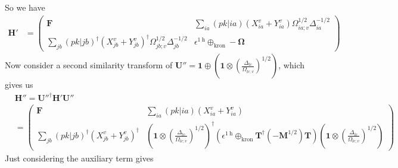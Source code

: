 So we have
\begin{align}
    \bm{H'} &= \begin{pmatrix} \bm{F} & \sum_{ia} (pk|ia) \left( X_{ia}^{v} + Y_{ia}^{v} \right) \Omega_{ia;v}^{1/2} \Delta _{ia}^{-1/2} \\ \sum_{jb} (pk|jb)^\dagger \left( X_{jb}^{v} + Y_{jb}^{v} \right)^\dagger \Omega_{jb;v}^{1/2} \Delta _{jb}^{-1/2} & \epsilon^{1 \mathrm{~h}} \oplus_{\text{kron}} - \bm{\Omega }\end{pmatrix}
\end{align}
Now consider a second similarity transform of $\bm{U}'' = \bm{1} \oplus \left( \bm{1} \otimes \left(\frac{\Delta _{lc}}{\Omega _{lc;v}}\right)^{1/2} \right)$, which gives us
\begin{align}
    &\bm{H''} = \bm{U}''^\dag \bm{H'} \bm{U}'' \\
&= \begin{pmatrix} \bm{F} & \sum_{ia} (pk|ia) \left( X_{ia}^{v} + Y_{ia}^{v} \right) \\ \sum_{jb} (pk|jb)^\dagger \left( X_{jb}^{v} + Y_{jb}^{v} \right)^\dagger & \left( \bm{1} \otimes \left(\frac{\Delta _{lc}}{\Omega _{lc;v}}\right)^{1/2} \right)^\dag \left(\epsilon^{1 \mathrm{~h}} \oplus_{\text{kron}}\bm{T}^\dagger (-\bm{M}^{1/2}) \bm{T}\right)\left( \bm{1} \otimes \left(\frac{\Delta _{lc}}{\Omega _{lc;v}}\right)^{1/2} \right)\end{pmatrix}
\end{align}
Just considering the auxiliary term gives
